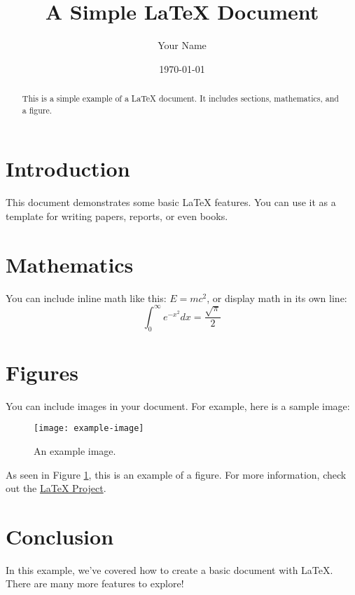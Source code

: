 \documentclass{article}
\begin{document}
\title{A Simple LaTeX Document}
\author{Your Name}
\date{\today}

\maketitle

\begin{abstract}
This is a simple example of a LaTeX document. It includes sections, mathematics, and a figure.
\end{abstract}

\section{Introduction}
This document demonstrates some basic \LaTeX{} features. You can use it as a template for writing papers, reports, or even books.

\section{Mathematics}
You can include inline math like this: $E = mc^2$, or display math in its own line:
\[
\int_0^\infty e^{-x^2} dx = \frac{\sqrt{\pi}}{2}
\]

\section{Figures}
You can include images in your document. For example, here is a sample image:

\begin{figure}[h]
    \centering
    \texttt{[image: example-image]}
    \caption{An example image.}
    \label{fig:example}
\end{figure}

As seen in Figure \ref{fig:example}, this is an example of a figure. For more information, check out the \href{https://www.latex-project.org/}{LaTeX Project}.

\section{Conclusion}
In this example, we've covered how to create a basic document with \LaTeX{}. There are many more features to explore!

\end{document}
